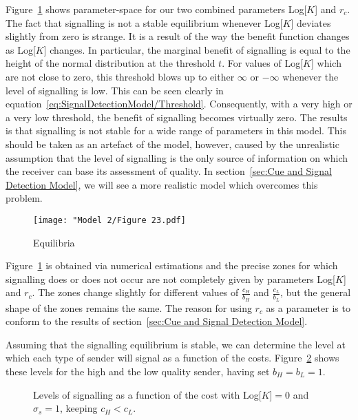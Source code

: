 \documentclass[a4paper,12pt]{article}
\numberwithin{equation}{section}
\begin{document}
Figure~\ref{fig:Model 2/Figure 23.pdf} shows parameter-space for our two combined parameters Log[$K$] and $r_{c}$. The fact that signalling is not a stable equilibrium whenever Log[$K$] deviates slightly from zero is strange. It is a result of the way the benefit function changes as Log[$K$] changes. In particular, the marginal benefit of signalling is equal to the height of the normal distribution at the threshold $t$. For values of Log[$K$] which are not close to zero, this threshold blows up to either $\infty$ or $-\infty$ whenever the level of signalling is low. This can be seen clearly in equation~\ref{eq:SignalDetectionModel/Threshold}. Consequently, with a very high or a very low threshold, the benefit of signalling becomes virtually zero. The results is that signalling is not stable for a wide range of parameters in this model. This should be taken as an artefact of the model, however, caused by the unrealistic assumption that the level of signalling is the only source of information on which the receiver can base its assessment of quality. In section~\ref{sec:Cue and Signal Detection Model}, we will see a more realistic model which overcomes this problem.

\begin{figure}[h]
\begin{center}
\leavevmode
\texttt{[image: "Model 2/Figure 23.pdf]}
\caption{Equilibria}
\label{fig:Model 2/Figure 23.pdf}
\end{center}
\end{figure}

Figure~\ref{fig:Model 2/Figure 23.pdf} is obtained via numerical estimations and the precise zones for which signalling does or does not occur are not completely given by parameters Log[$K$] and $r_{c}$. The zones change slightly for different values of $\frac{c_{H}}{b_{H}}$ and $\frac{c_{L}}{b_{L}}$, but the general shape of the zones remains the same. The reason for using $r_{c}$ as a parameter is to conform to the results of section~\ref{sec:Cue and Signal Detection Model}.

Assuming that the signalling equilibrium is stable, we can determine the level at which each type of sender will signal as a function of the costs. Figure~\ref{fig:Model 2/Figure 2425} shows these levels for the high and the low quality sender, having set $b_{H}=b_{L}=1$.
\begin{figure}[h]
\captionsetup{width=380pt}
\begin{center}
\hspace{10mm}
\caption{Levels of signalling as a function of the cost with Log[$K$]$=0$ and $\sigma_{s}=1$, keeping $c_{H}<c_{L}$.}
\label{fig:Model 2/Figure 2425}
\end{center}
\end{figure}
\end{document}
